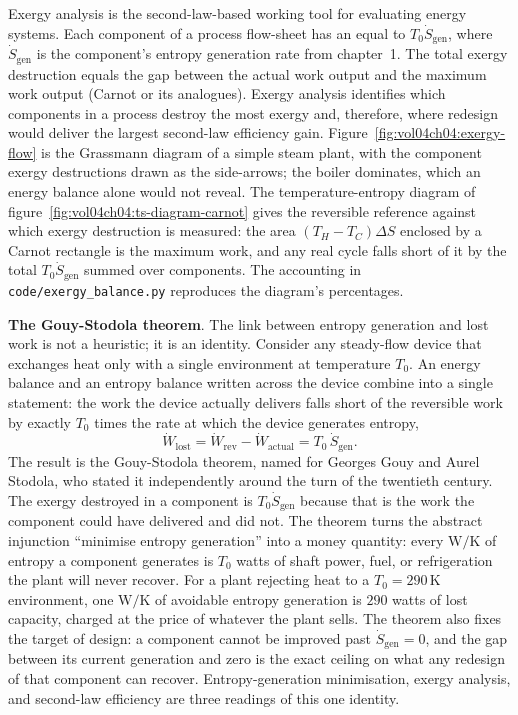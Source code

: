Exergy analysis is the second-law-based working tool for evaluating
energy systems. Each component of a process flow-sheet has an
 equal to $T_0 \dot{S}_{\text{gen}}$,
where $\dot{S}_{\text{gen}}$ is the component's entropy generation
rate from chapter~1. The total exergy destruction equals the gap
between the actual work output and the maximum work output (Carnot
or its analogues). Exergy analysis identifies which components in a
process destroy the most exergy and, therefore, where redesign would
deliver the largest second-law efficiency gain.
Figure~\ref{fig:vol04ch04:exergy-flow} is the Grassmann diagram of a
simple steam plant, with the component exergy destructions drawn as the
side-arrows; the boiler dominates, which an energy balance alone would
not reveal. The temperature-entropy diagram of
figure~\ref{fig:vol04ch04:ts-diagram-carnot} gives the reversible
reference against which exergy destruction is measured: the area
$(T_H - T_C)\Delta S$ enclosed by a Carnot rectangle is the maximum
work, and any real cycle falls short of it by the total
$T_0 \dot S_{\text{gen}}$ summed over components. The accounting in
\texttt{code/exergy\_balance.py} reproduces the diagram's percentages.

\begin{mastery}
\textbf{The Gouy-Stodola theorem}. The link between entropy generation
and lost work is not a heuristic; it is an identity. Consider any
steady-flow device that exchanges heat only with a single environment at
temperature $T_0$. An energy balance and an entropy balance written
across the device combine into a single statement: the work the device
actually delivers falls short of the reversible work by exactly
$T_0$ times the rate at which the device generates entropy,
\[
\dot W_{\text{lost}} = \dot W_{\text{rev}} - \dot W_{\text{actual}}
= T_0\,\dot S_{\text{gen}}.
\]
The result is the Gouy-Stodola theorem, named for Georges Gouy and
Aurel Stodola, who stated it independently around the turn of the
twentieth century. The exergy destroyed in a component is $T_0
\dot S_{\text{gen}}$ because that is the work the component could have
delivered and did not. The theorem turns the abstract injunction
``minimise entropy generation'' into a money quantity: every
$\si{\watt\per\kelvin}$ of entropy a component generates is $T_0$ watts
of shaft power, fuel, or refrigeration the plant will never recover.
For a plant rejecting heat to a $T_0 = 290\,\si{\kelvin}$ environment,
one $\si{\watt\per\kelvin}$ of avoidable entropy generation is $290$
watts of lost capacity, charged at the price of whatever the plant
sells. The theorem also fixes the target of design: a component cannot
be improved past $\dot S_{\text{gen}} = 0$, and the gap between its
current generation and zero is the exact ceiling on what any redesign of
that component can recover. Entropy-generation minimisation, exergy
analysis, and second-law efficiency are three readings of this one
identity.
\end{mastery}

